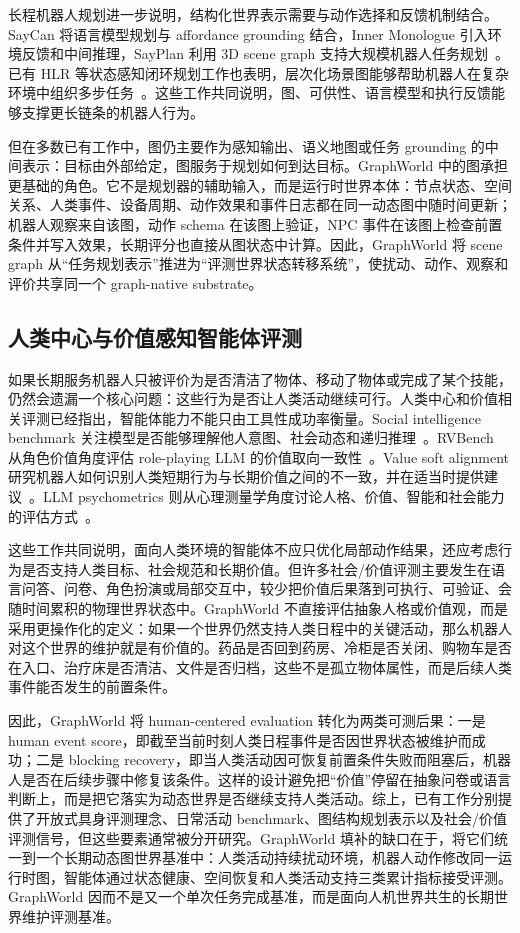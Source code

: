 \documentclass[journal]{IEEEtran}
\begin{document}
长程机器人规划进一步说明，结构化世界表示需要与动作选择和反馈机制结合。SayCan 将语言模型规划与 affordance grounding 结合，Inner Monologue 引入环境反馈和中间推理，SayPlan 利用 3D scene graph 支持大规模机器人任务规划~\cite{saycan2022,innermonologue2022,sayplan2023}。已有 HLR 等状态感知闭环规划工作也表明，层次化场景图能够帮助机器人在复杂环境中组织多步任务~\cite{hlr2025}。这些工作共同说明，图、可供性、语言模型和执行反馈能够支撑更长链条的机器人行为。

但在多数已有工作中，图仍主要作为感知输出、语义地图或任务 grounding 的中间表示：目标由外部给定，图服务于规划如何到达目标。GraphWorld 中的图承担更基础的角色。它不是规划器的辅助输入，而是运行时世界本体：节点状态、空间关系、人类事件、设备周期、动作效果和事件日志都在同一动态图中随时间更新；机器人观察来自该图，动作 schema 在该图上验证，NPC 事件在该图上检查前置条件并写入效果，长期评分也直接从图状态中计算。因此，GraphWorld 将 scene graph 从“任务规划表示”推进为“评测世界状态转移系统”，使扰动、动作、观察和评价共享同一个 graph-native substrate。

\subsection{人类中心与价值感知智能体评测}
如果长期服务机器人只被评价为是否清洁了物体、移动了物体或完成了某个技能，仍然会遗漏一个核心问题：这些行为是否让人类活动继续可行。人类中心和价值相关评测已经指出，智能体能力不能只由工具性成功率衡量。Social intelligence benchmark 关注模型是否能够理解他人意图、社会动态和递归推理~\cite{socialintelligence2024}。RVBench 从角色价值角度评估 role-playing LLM 的价值取向一致性~\cite{rvbench2025}。Value soft alignment 研究机器人如何识别人类短期行为与长期价值之间的不一致，并在适当时提供建议~\cite{valuesoftalignment2024}。LLM psychometrics 则从心理测量学角度讨论人格、价值、智能和社会能力的评估方式~\cite{llmpsychometrics2026}。

这些工作共同说明，面向人类环境的智能体不应只优化局部动作结果，还应考虑行为是否支持人类目标、社会规范和长期价值。但许多社会/价值评测主要发生在语言问答、问卷、角色扮演或局部交互中，较少把价值后果落到可执行、可验证、会随时间累积的物理世界状态中。GraphWorld 不直接评估抽象人格或价值观，而是采用更操作化的定义：如果一个世界仍然支持人类日程中的关键活动，那么机器人对这个世界的维护就是有价值的。药品是否回到药房、冷柜是否关闭、购物车是否在入口、治疗床是否清洁、文件是否归档，这些不是孤立物体属性，而是后续人类事件能否发生的前置条件。

因此，GraphWorld 将 human-centered evaluation 转化为两类可测后果：一是 human event score，即截至当前时刻人类日程事件是否因世界状态被维护而成功；二是 blocking recovery，即当人类活动因可恢复前置条件失败而阻塞后，机器人是否在后续步骤中修复该条件。这样的设计避免把“价值”停留在抽象问卷或语言判断上，而是把它落实为动态世界是否继续支持人类活动。综上，已有工作分别提供了开放式具身评测理念、日常活动 benchmark、图结构规划表示以及社会/价值评测信号，但这些要素通常被分开研究。GraphWorld 填补的缺口在于，将它们统一到一个长期动态图世界基准中：人类活动持续扰动环境，机器人动作修改同一运行时图，智能体通过状态健康、空间恢复和人类活动支持三类累计指标接受评测。GraphWorld 因而不是又一个单次任务完成基准，而是面向人机世界共生的长期世界维护评测基准。
\end{document}
